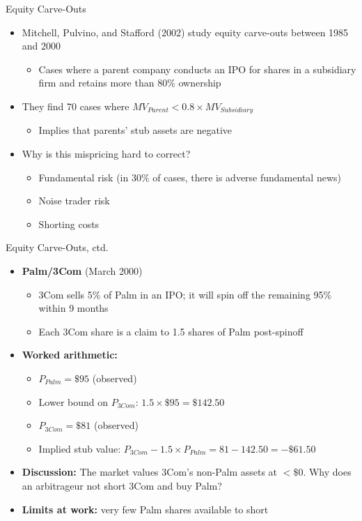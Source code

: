 \documentclass[aspectratio=169, 11pt]{beamer}
\begin{document}
\begin{frame}[shrink=5]{Equity Carve-Outs}
\begin{itemize}
\item Mitchell, Pulvino, and Stafford (2002) study equity carve-outs between 1985 and 2000
  \begin{itemize}
  \item Cases where a parent company conducts an IPO for shares in a subsidiary firm and retains more than 80\% ownership
  \end{itemize}
\item They find 70 cases where $MV_{Parent} < 0.8 \times MV_{Subsidiary}$
  \begin{itemize}
  \item Implies that parents' stub assets are negative
  \end{itemize}
\item Why is this mispricing hard to correct?
  \begin{itemize}
  \item Fundamental risk (in 30\% of cases, there is adverse fundamental news)
  \item Noise trader risk
  \item Shorting costs
  \end{itemize}
\end{itemize}
\end{frame}

\begin{frame}[shrink=10]{Equity Carve-Outs, ctd.}
\begin{itemize}
\item \textbf{Palm/3Com} (March 2000)
  \begin{itemize}
  \item 3Com sells 5\% of Palm in an IPO; it will spin off the remaining 95\% within 9 months
  \item Each 3Com share is a claim to 1.5 shares of Palm post-spinoff
  \end{itemize}
\item \textbf{Worked arithmetic:}
  \begin{itemize}
  \item $P_{Palm} = \$95$ (observed)
  \item Lower bound on $P_{3Com}$: $1.5 \times \$95 = \$142.50$
  \item $P_{3Com} = \$81$ (observed)
  \item Implied stub value: $P_{3Com} - 1.5 \times P_{Palm} = 81 - 142.50 = -\$61.50$
  \end{itemize}
\item \textbf{Discussion:} The market values 3Com's non-Palm assets at $<\$0$. Why does an arbitrageur not short 3Com and buy Palm?
\item \textbf{Limits at work:} very few Palm shares available to short
\end{itemize}
\end{frame}
\end{document}

